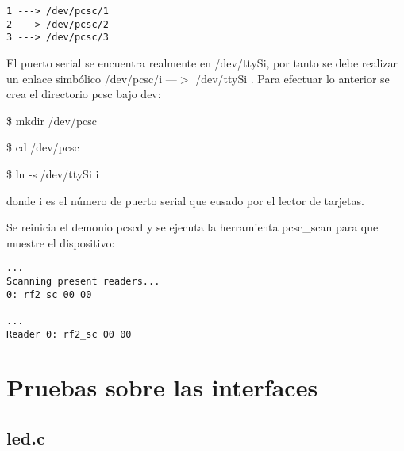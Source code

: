 \begin{verbatim}
1 ---> /dev/pcsc/1 
2 ---> /dev/pcsc/2 
3 ---> /dev/pcsc/3 
\end{verbatim}

El puerto serial se encuentra realmente en /dev/ttySi, por tanto se debe realizar un enlace simbólico /dev/pcsc/i ---$>$ /dev/ttySi . Para efectuar lo anterior se crea el directorio pcsc bajo dev: 

\bigskip
\centerline{\$ mkdir /dev/pcsc}

\centerline{\$ cd /dev/pcsc}

\centerline{\$ ln -s /dev/ttySi i}

donde i es el número de puerto serial que eusado por el lector de tarjetas. 

\bigskip
Se reinicia el demonio pcscd y se ejecuta la herramienta pcsc\_scan para que muestre el dispositivo: 

\begin{verbatim}
...	
Scanning present readers... 
0: rf2_sc 00 00 

... 
Reader 0: rf2_sc 00 00 
\end{verbatim}


\section{Pruebas sobre las interfaces}

\subsection{led.c}\label{anx_sw_led}

